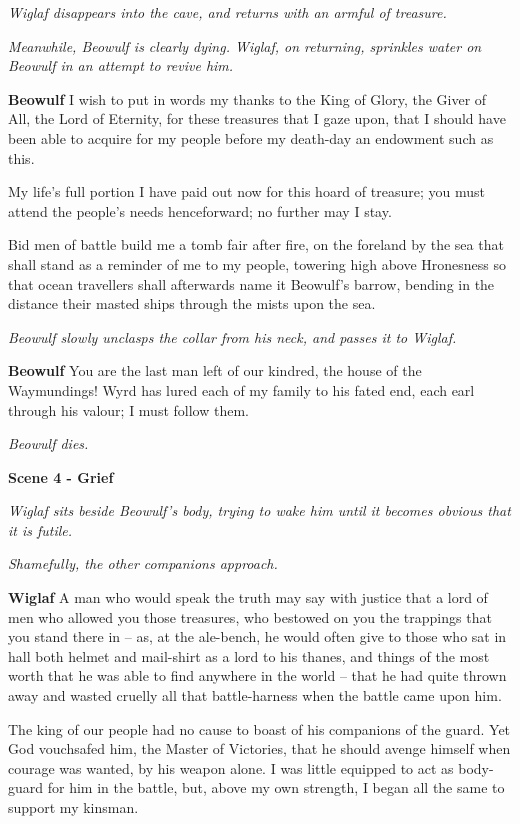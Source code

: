 \documentclass[a4paper]{article}
\begin{document}
{\centerline{\textit{Wiglaf disappears into the cave, and returns with an armful of treasure.}}
\centerline{\textit{Meanwhile, Beowulf is clearly dying. Wiglaf, on returning, sprinkles water on Beowulf in an attempt to revive him.}}

\textbf{Beowulf} I wish to put in words my thanks
to the King of Glory, the Giver of All,
the Lord of Eternity, for these treasures that I gaze upon,
that I should have been able to acquire for my people
before my death-day an endowment such as this.

My life’s full portion I have paid out now
for this hoard of treasure; you must attend the people’s
needs henceforward; no further may I stay.

Bid men of battle build me a tomb
fair after fire, on the foreland by the sea
that shall stand as a reminder of me to my people,
towering high above Hronesness
so that ocean travellers shall afterwards name it
Beowulf’s barrow, bending in the distance
their masted ships through the mists upon the sea.

\centerline{\textit{Beowulf slowly unclasps the collar from his neck, and passes it to Wiglaf.}}

\textbf{Beowulf} You are the last man left of our kindred,
the house of the Waymundings! Wyrd has lured
each of my family to his fated end,
each earl through his valour; I must follow them.

\centerline{\textit{Beowulf dies.}}

\centerline{\textbf{Scene 4 - Grief}}
\centerline{\textit{Wiglaf sits beside Beowulf's body, trying to wake him until it becomes obvious that it is futile.}}
\centerline{\textit{Shamefully, the other companions approach.}}

\textbf{Wiglaf} A man who would speak the truth may say with justice
that a lord of men who allowed you those treasures,
who bestowed on you the trappings that you stand there in
– as, at the ale-bench, he would often give
to those who sat in hall both helmet and
mail-shirt
as a lord to his thanes, and things of the most worth
that he was able to find anywhere in the world –
that he had quite thrown away and wasted cruelly
all that battle-harness when the battle came upon him.

The king of our people had no cause to boast
of his companions of the guard. Yet God vouchsafed him,
the Master of Victories, that he should avenge himself
when courage was wanted, by his weapon alone.
I was little equipped to act as body-guard
for him in the battle, but, above my own strength,
I began all the same to support my kinsman.

}
\end{document}
